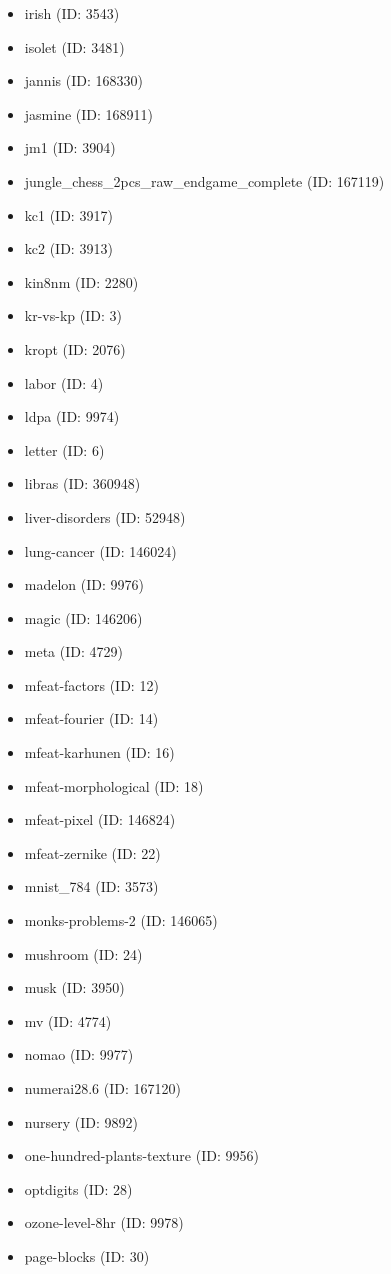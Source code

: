 \begin{itemize}
  \item irish (ID: 3543)
  \item isolet (ID: 3481)
  \item jannis (ID: 168330)
  \item jasmine (ID: 168911)
  \item jm1 (ID: 3904)
  \item jungle\_chess\_2pcs\_raw\_endgame\_complete (ID: 167119)
  \item kc1 (ID: 3917)
  \item kc2 (ID: 3913)
  \item kin8nm (ID: 2280)
  \item kr-vs-kp (ID: 3)
  \item kropt (ID: 2076)
  \item labor (ID: 4)
  \item ldpa (ID: 9974)
  \item letter (ID: 6)
  \item libras (ID: 360948)
  \item liver-disorders (ID: 52948)
  \item lung-cancer (ID: 146024)
  \item madelon (ID: 9976)
  \item magic (ID: 146206)
  \item meta (ID: 4729)
  \item mfeat-factors (ID: 12)
  \item mfeat-fourier (ID: 14)
  \item mfeat-karhunen (ID: 16)
  \item mfeat-morphological (ID: 18)
  \item mfeat-pixel (ID: 146824)
  \item mfeat-zernike (ID: 22)
  \item mnist\_784 (ID: 3573)
  \item monks-problems-2 (ID: 146065)
  \item mushroom (ID: 24)
  \item musk (ID: 3950)
  \item mv (ID: 4774)
  \item nomao (ID: 9977)
  \item numerai28.6 (ID: 167120)
  \item nursery (ID: 9892)
  \item one-hundred-plants-texture (ID: 9956)
  \item optdigits (ID: 28)
  \item ozone-level-8hr (ID: 9978)
  \item page-blocks (ID: 30)

\end{itemize}
